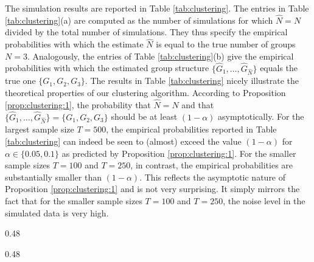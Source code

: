 \documentclass[12pt]{article}
\begin{document}
The simulation results are reported in Table \ref{tab:clustering}. The entries in Table \ref{tab:clustering}(a) are computed as the number of simulations for which $\widehat{N} = N$ divided by the total number of simulations. They thus specify the empirical probabilities with which the estimate $\widehat{N}$ is equal to the true number of groups $N = 3$. Analogously, the entries of Table \ref{tab:clustering}(b) give the empirical probabilities with which the estimated group structure $\{ \widehat{G}_1,\ldots,\widehat{G}_{\widehat{N}}\}$ equals the true one $\{G_1,G_2,G_3\}$. The results in Table \ref{tab:clustering} nicely illustrate the theoretical properties of our clustering algorithm. According to Proposition \ref{prop:clustering:1}, the probability that $\widehat{N} = N$ and that $\{ \widehat{G}_1,\ldots,\widehat{G}_{\widehat{N}}\} = \{G_1,G_2,G_3\}$ should be at least $(1-\alpha)$ asymptotically. For the largest sample size $T = 500$, the empirical probabilities reported in Table \ref{tab:clustering} can indeed be seen to (almost) exceed the value $(1-\alpha)$ for $\alpha \in \{0.05,0.1\}$ as predicted by Proposition \ref{prop:clustering:1}.
For the smaller sample sizes $T=100$ and $T=250$, in contrast, the empirical probabilities are substantially smaller than $(1-\alpha)$. This reflects the asymptotic nature of Proposition \ref{prop:clustering:1} and is not very surprising. It simply mirrors the fact that for the smaller sample sizes $T=100$ and $T=250$, the noise level in the simulated data is very high.


\begin{table}[t]
\footnotesize{
\begin{center}
\caption{Clustering results for different time series lengths $T$ and nominal sizes $\alpha$.}\label{tab:clustering}
\begin{subtable}[b]{0.48\textwidth}
\centering
\caption{Empirical probabilities that \\ $\widehat{N} = N$}\label{tab:clustering:1}
\renewcommand{\arraystretch}{1.2}

\end{subtable}
\begin{subtable}[b]{0.48\textwidth}
\centering
\caption{\centering Empirical probabilities that $\{ \widehat{G}_1,\ldots,\widehat{G}_{\widehat{N}}\} = \{ G_1,G_2,G_3\}$}\label{tab:clustering:2}
\renewcommand{\arraystretch}{1.2}

\end{subtable}
\end{center}}
\vspace{-0.5cm}
\end{table}
\end{document}
